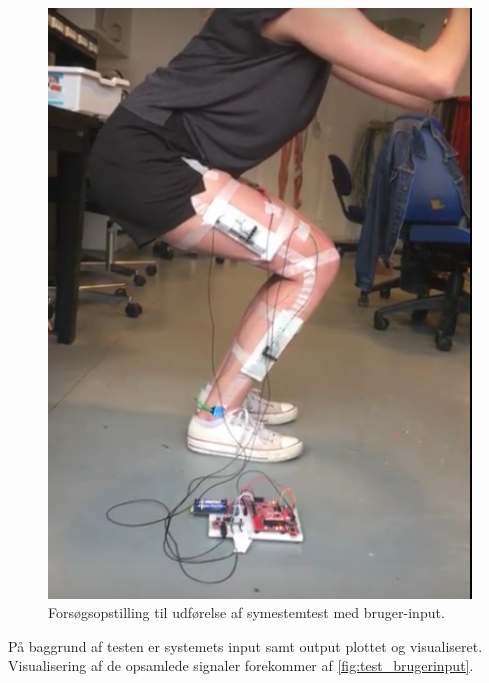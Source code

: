 \begin{figure}[H]
\centering
\includegraphics[width=1\textwidth]{figures/test_squat}
\caption{Forsøgsopstilling til udførelse af symestemtest med bruger-input.}
\label{fig:test_squat}
\end{figure}

\noindent
På baggrund af testen er systemets input samt output plottet og visualiseret. Visualisering af de opsamlede signaler forekommer af \autoref{fig:test_brugerinput}. 
 
